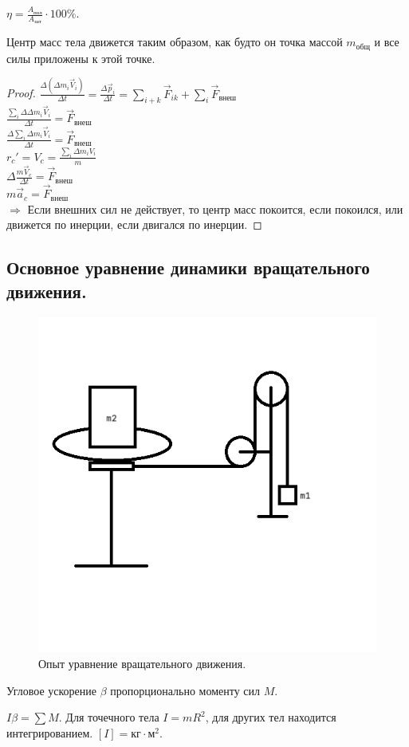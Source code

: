 \documentclass[12pt]{article}
\begin{document}
	\begin{definition}[КПД]
		$\eta = \frac{A_{\text{пол}}}{A_{\text{зат}}} \cdot 100\%$.
	\end{definition}
	\begin{theorem}
		Центр масс тела движется таким образом, как будто он точка массой $m_{\text{общ}}$ и все силы приложены к этой точке.
	\end{theorem}
	\begin{proof}
		$\frac{\varDelta (\varDelta m_i \vec{V}_i)}{\varDelta t} = \frac{\varDelta \vec{p}_i}{\varDelta t} = \sum\limits_{i + k} \vec{F}_{ik} + \sum\limits_i \vec{F}_{\text{внеш}}$ \\
		$\frac{\sum\limits_i \varDelta \varDelta m_i \vec{V}_i}{\varDelta t} = \vec{F}_{\text{внеш}}$ \\
		$\frac{\varDelta \sum\limits_i \varDelta m_i \vec{V}_i}{\varDelta t} = \vec{F}_{\text{внеш}}$ \\
		$r_c' = V_c = \frac{\sum\limits_i \varDelta m_i V_i}{m}$ \\
		$\varDelta \frac{m \vec{V}_c}{\varDelta t} = \vec{F}_{\text{внеш}}$ \\
		$m \vec{a}_c = \vec{F}_{\text{внеш}}$ \\
		$\Rightarrow$ Если внешних сил не действует, то центр масс покоится, если покоился, или движется по инерции, если двигался по инерции.
	\end{proof}
	\subsection{Основное уравнение динамики вращательного движения.}
	\begin{figure}[H]
		\includegraphics[height=0.5\textwidth]{extra-materials/УравнениеВращательногоДвиженияОпыт}
		\caption{Опыт уравнение вращательного движения.}
	\end{figure}
	Угловое ускорение $\beta$ пропорционально моменту сил $M$.
	\begin{definition}
		$I \beta = \sum M$. Для точечного тела $I = mR^2$, для других тел находится интегрированием. $[I] = \text{кг} \cdot \text{м}^2$.
	\end{definition}
\end{document}
